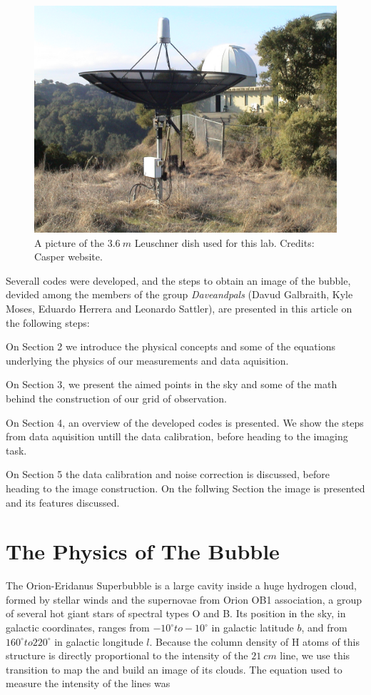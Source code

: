 \documentclass{article}
\begin{document}
\begin{figure}[H]
\center
\includegraphics[scale=0.2]{dish.jpg}
\caption {A picture of the $3.6 \ m$ Leuschner dish used for this lab. Credits: Casper website.} 
\label{antenna}
\end{figure}

Severall codes were developed, and the steps to
obtain an image of the bubble, devided among the members
of the group \emph{Daveandpals} (Davud Galbraith, Kyle Moses, Eduardo
Herrera and Leonardo Sattler), are presented in this article on the
following steps:

On Section 2 we introduce the physical concepts and some of the
equations underlying the physics of our measurements and data
aquisition. 

On Section 3, we present the aimed points in the
sky and some of the math behind the construction
of our grid of observation.

On Section 4,  an overview of the developed codes is presented.
We show the steps from data aquisition untill the data
calibration, before heading to the imaging task.

On Section 5 the data calibration and noise correction
is discussed, before heading to the image construction. 
On the follwing Section the image is presented and its features
discussed.

\section{The Physics of The Bubble}

The Orion-Eridanus Superbubble is a large cavity inside a huge hydrogen
cloud, formed by stellar winds and the supernovae from Orion OB1
association, a group of several hot giant stars of spectral types O and
B. Its position in the sky, in galactic coordinates, ranges from $-10
^{\circ} to -10^{\circ}$ in galactic latitude $b$, and from $160^{\circ}
to 220^{\circ}$ in galactic longitude $l$. Because the column density of
H atoms of this structure is directly proportional to the intensity of
the $21 \ cm$ line, we use this transition to map the and build an image
of its clouds. The equation used to measure the intensity of the lines
was 
\end{document}
